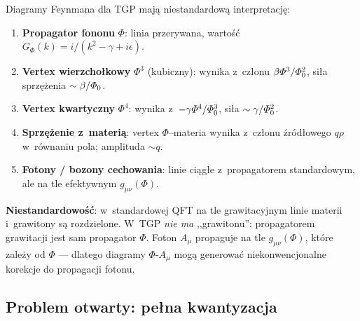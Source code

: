 \begin{remark}\label{rem:feynman-rules}
Diagramy Feynmana dla TGP mają niestandardową interpretację:
\begin{enumerate}[nosep]
    \item \textbf{Propagator fononu} $\Phi$: linia przerywana,
          wartość $G_\Phi(k) = i/(k^2 - \gamma + i\epsilon)$.
    \item \textbf{Vertex wierzchołkowy} $\Phi^3$ (kubiczny):
          wynika z~członu $\beta\varPhi^3/\varPhi_0^2$, siła
          sprzężenia $\sim \beta/\varPhi_0$.
    \item \textbf{Vertex kwartyczny} $\Phi^4$:
          wynika z~$-\gamma\varPhi^4/\varPhi_0^3$,
          siła $\sim \gamma/\varPhi_0^2$.
    \item \textbf{Sprzężenie z~materią}: vertex $\Phi$--materia
          wynika z~członu źródłowego $q\rho$ w~równaniu pola;
          amplituda $\sim q$.
    \item \textbf{Fotony / bozony cechowania}: linie ciągłe
          z~propagatorem standardowym, ale na tle efektywnym
          $g_{\mu\nu}(\Phi)$.
\end{enumerate}

\textbf{Niestandardowość}: w~standardowej QFT na tle grawitacyjnym
linie materii i~grawitony są rozdzielone. W~TGP \emph{nie ma}
,,grawitonu'': propagatorem grawitacji jest sam propagator $\Phi$.
Foton $A_\mu$ propaguje na tle $g_{\mu\nu}(\Phi)$, które zależy
od $\Phi$ --- dlatego diagramy $\Phi$-$A_\mu$ mogą generować
niekonwencjonalne korekcje do propagacji fotonu.
\end{remark}

\subsection{Problem otwarty: pełna kwantyzacja}%
\label{app:E-open}

